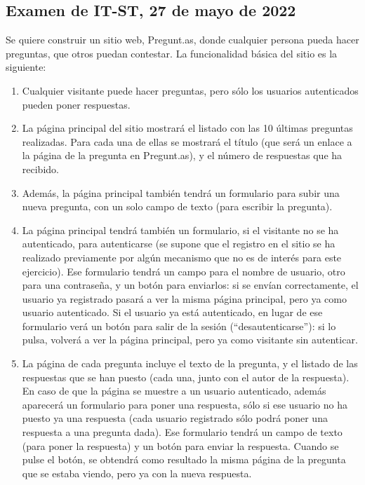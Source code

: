 \subsection{Examen de IT-ST, 27 de mayo de 2022}

Se quiere construir un sitio web, Pregunt.as, donde cualquier persona pueda hacer preguntas, que otros puedan contestar. La funcionalidad básica del sitio es la siguiente:

\begin{enumerate}
\item Cualquier visitante puede hacer preguntas, pero sólo los usuarios autenticados pueden poner respuestas.

\item La página principal del sitio mostrará el listado con las 10 últimas preguntas realizadas. Para cada una de ellas se mostrará el título (que será un enlace a la página de la pregunta en Pregunt.as), y el número de respuestas que ha recibido.

\item Además, la página principal también tendrá un formulario para subir una nueva pregunta, con un solo campo de texto (para escribir la pregunta).

\item La página principal tendrá también un formulario, si el visitante no se ha autenticado, para autenticarse (se supone que el registro en el sitio se ha realizado previamente por algún mecanismo que no es de interés para este ejercicio). Ese formulario tendrá un campo para el nombre de usuario, otro para una contraseña, y un botón para enviarlos: si se envían correctamente, el usuario ya registrado pasará a ver la misma página principal, pero ya como usuario autenticado. Si el usuario ya está autenticado, en lugar de ese formulario verá un botón para salir de la sesión (``desautenticarse''): si lo pulsa, volverá a ver la página principal, pero ya como visitante sin autenticar.

\item La página de cada pregunta incluye el texto de la pregunta, y el listado de las respuestas que se han puesto (cada una, junto con el autor de la respuesta). En caso de que la página se muestre a un usuario autenticado, además aparecerá un formulario para poner una respuesta, sólo si ese usuario no ha puesto ya una respuesta (cada usuario registrado sólo podrá poner una respuesta a una pregunta dada). Ese formulario tendrá un campo de texto (para poner la respuesta) y un botón para enviar la respuesta. Cuando se pulse el botón, se obtendrá como resultado la misma página de la pregunta que se estaba viendo, pero ya con la nueva respuesta.


\end{enumerate}
